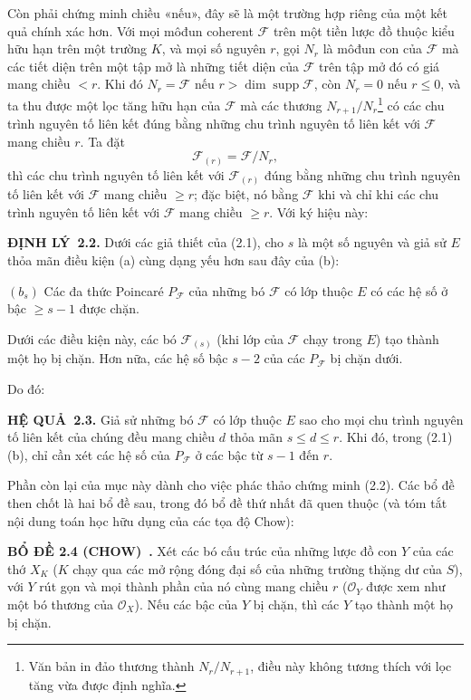 \documentclass[11pt,twoside,openany]{book}
\numberwithin{equation}{section}
\newcommand{\src}[1]{%
  \phantomsection\hypertarget{src:\fgasourceid:#1}{}%
  \marginpar{\raggedleft\footnotesize\sffamily #1}%
}
\newcommand{\fgasourceid}{unset}
\newcommand{\result}[2]{\par\medskip\noindent\textbf{#1\if\relax\detokenize{#2}\relax\else\ #2\fi.}\quad}
\begin{document}
Còn phải chứng minh chiều «nếu», đây sẽ là một trường hợp riêng của một kết quả
chính xác hơn. Với mọi môđun coherent $\mathcal F$ trên một tiền lược đồ thuộc
kiểu hữu hạn trên một trường $K$, và mọi số nguyên $r$, gọi $N_r$ là môđun con
của $\mathcal F$ mà các tiết diện trên một tập mở là những tiết diện của
$\mathcal F$ trên tập mở đó có giá mang chiều $<r$. Khi đó
$N_r=\mathcal F$ nếu $r>\dim\operatorname{supp}\mathcal F$, còn $N_r=0$ nếu
$r\leq0$, và ta thu được một lọc tăng hữu hạn của $\mathcal F$ mà các thương
$N_{r+1}/N_r$\footnote{Văn bản in đảo thương thành $N_r/N_{r+1}$, điều này
không tương thích với lọc tăng vừa được định nghĩa.} có các chu trình nguyên tố
liên kết đúng bằng những chu trình nguyên tố liên kết với $\mathcal F$ mang
chiều $r$. Ta đặt
\[
\mathcal F_{(r)}=\mathcal F/N_r,
\]
thì các chu trình nguyên tố liên kết với $\mathcal F_{(r)}$ đúng bằng những chu
trình nguyên tố liên kết với $\mathcal F$ mang chiều $\geq r$; đặc biệt, nó
bằng $\mathcal F$ khi và chỉ khi các chu trình nguyên tố liên kết với
$\mathcal F$ mang chiều $\geq r$. Với ký hiệu này:

\result{ĐỊNH LÝ}{2.2} Dưới các giả thiết của (2.1), cho $s$ là một số nguyên
và giả sử $E$ thỏa mãn điều kiện (a) cùng dạng yếu hơn sau đây của (b):

\medskip
\noindent $(b_s)$ Các đa thức Poincaré $P_{\mathcal F}$ của những bó
$\mathcal F$ có lớp thuộc $E$ có các hệ số ở bậc $\geq s-1$ được chặn.

Dưới các điều kiện này, các bó $\mathcal F_{(s)}$ (khi lớp của $\mathcal F$
chạy trong $E$) tạo thành một họ bị chặn. Hơn nữa, các hệ số bậc $s-2$ của
các $P_{\mathcal F}$ bị chặn dưới.
\src{255}
Do đó:

\result{HỆ QUẢ}{2.3} Giả sử những bó $\mathcal F$ có lớp thuộc $E$ sao cho
mọi chu trình nguyên tố liên kết của chúng đều mang chiều $d$ thỏa mãn
$s\leq d\leq r$. Khi đó, trong (2.1) (b), chỉ cần xét các hệ số của
$P_{\mathcal F}$ ở các bậc từ $s-1$ đến $r$.

Phần còn lại của mục này dành cho việc phác thảo chứng minh (2.2). Các bổ đề
then chốt là hai bổ đề sau, trong đó bổ đề thứ nhất đã quen thuộc (và tóm tắt
nội dung toán học hữu dụng của các tọa độ Chow):

\result{BỔ ĐỀ 2.4 (CHOW)}{} Xét các bó cấu trúc của những lược đồ con $Y$ của
các thớ $X_K$ ($K$ chạy qua các mở rộng đóng đại số của những trường thặng dư
của $S$), với $Y$ rút gọn và mọi thành phần của nó cùng mang chiều $r$
($\mathcal O_Y$ được xem như một bó thương của $\mathcal O_X$). Nếu các bậc
của $Y$ bị chặn, thì các $Y$ tạo thành một họ bị chặn.
\end{document}
